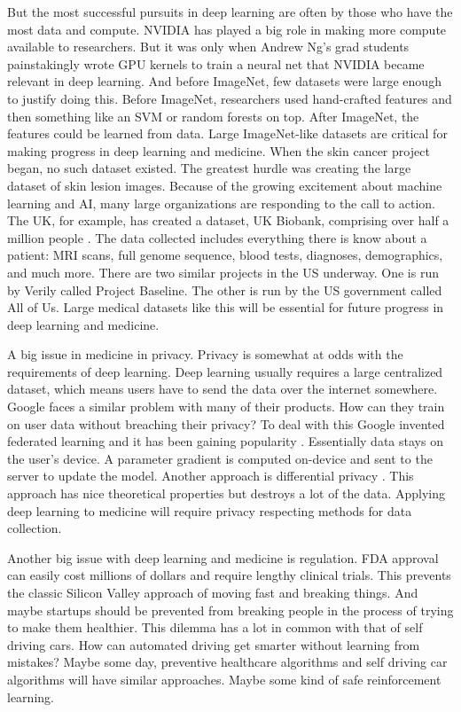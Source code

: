 But the most successful pursuits in deep learning are often by those who have the most data and compute.  NVIDIA has played a big role in making more compute available to researchers.  But it was only when Andrew Ng's grad students painstakingly wrote GPU kernels to train a neural net \cite{raina2009large} that NVIDIA became relevant in deep learning. And before ImageNet, few datasets were large enough to justify doing this.  Before ImageNet, researchers used hand-crafted features and then something like an SVM or random forests on top.  After ImageNet, the features could be learned from data.  Large ImageNet-like datasets are critical for making progress in deep learning and medicine.  When the skin cancer project began, no such dataset existed.  The greatest hurdle was creating the large dataset of skin lesion images.  Because of the growing excitement about machine learning and AI, many large organizations are responding to the call to action.  The UK, for example, has created a dataset, UK Biobank, comprising over half a million people \cite{sudlow2015uk}.  The data collected includes everything there is know about a patient: MRI scans, full genome sequence, blood tests, diagnoses, demographics, and much more.  There are two similar projects in the US underway.  One is run by Verily called Project Baseline.  The other is run by the US government called All of Us.  Large medical datasets like this will be essential for future progress in deep learning and medicine.

A big issue in medicine in privacy.  Privacy is somewhat at odds with the requirements of deep learning.  Deep learning usually requires a large centralized dataset, which means users have to send the data over the internet somewhere.  Google faces a similar problem with many of their products.  How can they train on user data without breaching their privacy?  To deal with this Google invented federated learning and it has been gaining popularity \cite{bonawitz2019towards}.  Essentially data stays on the user's device.  A parameter gradient is computed on-device and sent to the server to update the model.  Another approach is differential privacy \cite{abadi2016deep}.  This approach has nice theoretical properties but destroys a lot of the data.  Applying deep learning to medicine will require privacy respecting methods for data collection.

Another big issue with deep learning and medicine is regulation.  FDA approval can easily cost millions of dollars and require lengthy clinical trials.  This prevents the classic Silicon Valley approach of moving fast and breaking things.  And maybe startups should be prevented from breaking people in the process of trying to make them healthier.  This dilemma has a lot in common with that of self driving cars.  How can automated driving get smarter without learning from mistakes?  Maybe some day, preventive healthcare algorithms and self driving car algorithms will have similar approaches.  Maybe some kind of safe reinforcement learning.


